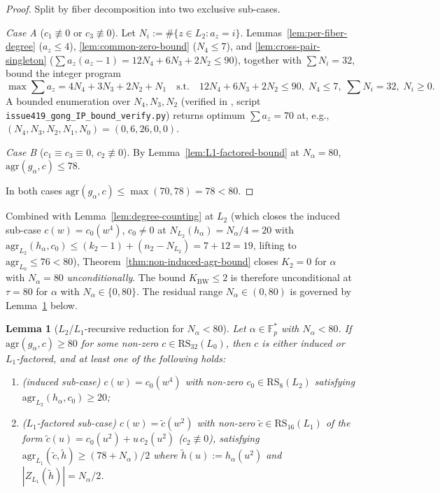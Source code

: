 \documentclass[11pt]{article}
\newtheorem{lemma}[theorem]{Lemma}
\theoremstyle{definition}
\theoremstyle{remark}
\begin{document}
\begin{proof}
Split by fiber decomposition into two exclusive sub-cases.

\emph{Case A} ($c_1 \not\equiv 0$ or $c_3 \not\equiv 0$). Let
$N_i := \#\{z \in L_2 : a_z = i\}$. Lemmas~\ref{lem:per-fiber-degree}
($a_z \leq 4$), \ref{lem:common-zero-bound} ($N_4 \leq 7$), and
\ref{lem:cross-pair-singleton} ($\sum a_z(a_z - 1) = 12 N_4 + 6 N_3
+ 2 N_2 \leq 90$), together with $\sum N_i = 32$, bound the integer
program
\[
\max \sum a_z = 4 N_4 + 3 N_3 + 2 N_2 + N_1
\quad \text{s.t.} \quad
12 N_4 + 6 N_3 + 2 N_2 \leq 90,\;
N_4 \leq 7,\;
\sum N_i = 32,\;
N_i \geq 0.
\]
A bounded enumeration over $N_4, N_3, N_2$ (verified in
\cite{CompanionRepo}, script \texttt{issue419\_gong\_IP\_bound\_verify.py})
returns optimum $\sum a_z = 70$ at, e.g.,
$(N_4, N_3, N_2, N_1, N_0) = (0, 6, 26, 0, 0)$.

\emph{Case B} ($c_1 \equiv c_3 \equiv 0$, $c_2 \not\equiv 0$). By
Lemma~\ref{lem:L1-factored-bound} at $N_\alpha = 80$,
$\mathrm{agr}(g_\alpha, c) \leq 78$.

In both cases $\mathrm{agr}(g_\alpha, c) \leq \max(70, 78) = 78 < 80$.
\end{proof}

Combined with Lemma~\ref{lem:degree-counting} at $L_2$ (which closes the induced sub-case
$c(w) = c_0(w^4)$, $c_0 \neq 0$ at $N_{L_2}(h_\alpha) = N_\alpha/4 = 20$
with $\mathrm{agr}_{L_2}(h_\alpha, c_0) \leq (k_2 - 1) + (n_2 - N_{L_2})
= 7 + 12 = 19$, lifting to $\mathrm{agr}_{L_0} \leq 76 < 80$),
Theorem~\ref{thm:non-induced-agr-bound} closes $K_2 = 0$ for $\alpha$
with $N_\alpha = 80$ \emph{unconditionally}. The bound
$K_{\mathrm{BW}} \leq 2$ is therefore unconditional at $\tau = 80$ for
$\alpha$ with $N_\alpha \in \{0, 80\}$. The residual range
$N_\alpha \in (0, 80)$ is governed by Lemma~\ref{lem:L2-recursion} below.

\begin{lemma}[$L_2$/$L_1$-recursive reduction for $N_\alpha < 80$]
\label{lem:L2-recursion}
Let $\alpha \in \mathbb{F}_p^*$ with $N_\alpha < 80$. If
$\mathrm{agr}(g_\alpha, c) \geq 80$ for some non-zero
$c \in \mathrm{RS}_{32}(L_0)$, then $c$ is either induced or
$L_1$-factored, and at least one of the following holds:
\begin{enumerate}[label=(\roman*), leftmargin=2em, nosep]
  \item \emph{(induced sub-case)} $c(w) = c_0(w^4)$ with non-zero
    $c_0 \in \mathrm{RS}_8(L_2)$ satisfying
    $\mathrm{agr}_{L_2}(h_\alpha, c_0) \geq 20$;
  \item \emph{($L_1$-factored sub-case)} $c(w) = \tilde c(w^2)$ with
    non-zero $\tilde c \in \mathrm{RS}_{16}(L_1)$ of the form
    $\tilde c(u) = c_0(u^2) + u\, c_2(u^2)$ ($c_2 \not\equiv 0$),
    satisfying $\mathrm{agr}_{L_1}(\tilde c, \tilde h) \geq (78 + N_\alpha)/2$
    where $\tilde h(u) := h_\alpha(u^2)$ and
    $|Z_{L_1}(\tilde h)| = N_\alpha/2$.
\end{enumerate}
\end{lemma}
\end{document}
